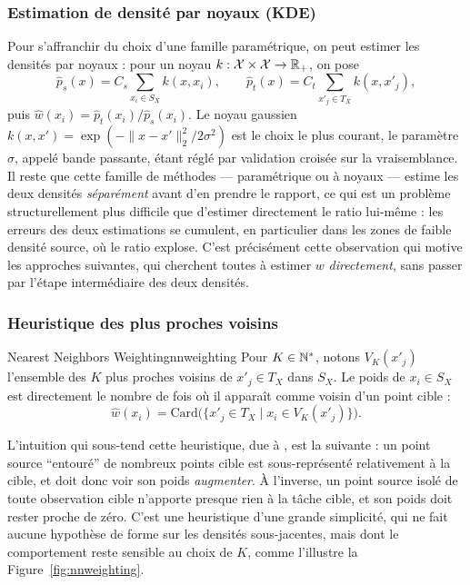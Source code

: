 \documentclass[11pt]{article}
\begin{document}
\subsubsection{Estimation de densité par noyaux (KDE)}

Pour s'affranchir du choix d'une famille paramétrique, on peut estimer les densités par noyaux : pour un
noyau $k:\mathcal{X}\times\mathcal{X}\to\mathbb{R}_+$, on pose
\[
\widehat p_s(x) = C_s \sum_{x_i\in S_X} k(x,x_i), \qquad
\widehat p_t(x) = C_t \sum_{x'_j\in T_X} k(x,x'_j),
\]
puis $\widehat w(x_i) = \widehat p_t(x_i)/\widehat p_s(x_i)$. Le noyau gaussien
$k(x,x')=\exp(-\|x-x'\|_2^2/2\sigma^2)$ est le choix le plus courant, le paramètre $\sigma$, appelé
bande passante, étant réglé par validation croisée sur la vraisemblance. Il reste que cette famille de
méthodes --- paramétrique ou à noyaux --- estime les deux densités \emph{séparément} avant d'en prendre
le rapport, ce qui est un problème structurellement plus difficile que d'estimer directement le ratio
lui-même : les erreurs des deux estimations se cumulent, en particulier dans les zones de faible densité
source, où le ratio explose. C'est précisément cette observation qui motive les approches suivantes,
qui cherchent toutes à estimer $w$ \emph{directement}, sans passer par l'étape intermédiaire des deux
densités.

\subsubsection{Heuristique des plus proches voisins}

\begin{definition}{Nearest Neighbors Weighting}{nnweighting}
Pour $K\in\mathbb{N}^*$, notons $V_K(x'_j)$ l'ensemble des $K$ plus proches voisins de $x'_j\in T_X$ dans $S_X$.
Le poids de $x_i\in S_X$ est directement le nombre de fois où il apparaît comme voisin d'un point cible :
\[
\widehat w(x_i) = \mathrm{Card}\big(\{x'_j\in T_X \mid x_i \in V_K(x'_j)\}\big).
\]
\end{definition}

L'intuition qui sous-tend cette heuristique, due à \citet{loog2012nearest}, est la suivante : un point
source \enquote{entouré} de nombreux points cible est sous-représenté relativement à la cible, et doit
donc voir son poids \emph{augmenter}. À l'inverse, un point source isolé de toute observation cible
n'apporte presque rien à la tâche cible, et son poids doit rester proche de zéro. C'est une heuristique
d'une grande simplicité, qui ne fait aucune hypothèse de forme sur les densités sous-jacentes, mais dont
le comportement reste sensible au choix de $K$, comme l'illustre la Figure~\ref{fig:nnweighting}.
\end{document}
